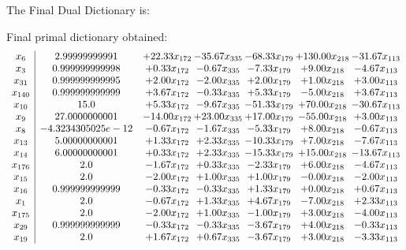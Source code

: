 \documentclass[8pt]{article}
\begin{document}
The Final Dual Dictionary is: 

 Final primal dictionary obtained: 
\[\begin{array}{c| c c@{\hskip 2pt} c@{\hskip 2pt} c@{\hskip 2pt} c@{\hskip 2pt} c@{\hskip 2pt} }
 x_{6}   &  2.99999999991 & + 22.33 x_{172} & -35.67 x_{335} & -68.33 x_{179} & + 130.00 x_{218} & -31.67 x_{113}\\
 x_{3}   &  0.999999999998 & +  0.33 x_{172} & -0.67 x_{335} & -7.33 x_{179} & +  9.00 x_{218} & -4.67 x_{113}\\
 x_{31}   &  0.999999999995 & +  2.00 x_{172} & -2.00 x_{335} & +  2.00 x_{179} & +  1.00 x_{218} & +  3.00 x_{113}\\
 x_{140}   &  0.999999999999 & +  3.67 x_{172} & -0.33 x_{335} & +  5.33 x_{179} & -5.00 x_{218} & +  3.67 x_{113}\\
 x_{10}   &  15.0 & +  5.33 x_{172} & -9.67 x_{335} & -51.33 x_{179} & + 70.00 x_{218} & -30.67 x_{113}\\
 x_{9}   &  27.0000000001 & -14.00 x_{172} & + 23.00 x_{335} & + 17.00 x_{179} & -55.00 x_{218} & +  3.00 x_{113}\\
 x_{8}   &  -4.3234305025e-12 & -0.67 x_{172} & -1.67 x_{335} & -5.33 x_{179} & +  8.00 x_{218} & -0.67 x_{113}\\
 x_{13}   &  5.00000000001 & +  1.33 x_{172} & +  2.33 x_{335} & -10.33 x_{179} & +  7.00 x_{218} & -7.67 x_{113}\\
 x_{14}   &  6.00000000001 & +  0.33 x_{172} & +  2.33 x_{335} & -15.33 x_{179} & + 15.00 x_{218} & -13.67 x_{113}\\
 x_{176}   &  2.0 & -1.67 x_{172} & +  0.33 x_{335} & -2.33 x_{179} & +  6.00 x_{218} & -4.67 x_{113}\\
 x_{15}   &  2.0 & -2.00 x_{172} & +  1.00 x_{335} & +  1.00 x_{179} & -0.00 x_{218} & -2.00 x_{113}\\
 x_{16}   &  0.999999999999 & -0.33 x_{172} & -0.33 x_{335} & +  1.33 x_{179} & +  0.00 x_{218} & +  0.67 x_{113}\\
 x_{1}   &  2.0 & -0.67 x_{172} & +  1.33 x_{335} & +  4.67 x_{179} & -7.00 x_{218} & +  2.33 x_{113}\\
 x_{175}   &  2.0 & -2.00 x_{172} & +  1.00 x_{335} & -1.00 x_{179} & +  3.00 x_{218} & -4.00 x_{113}\\
 x_{29}   &  0.999999999999 & -0.33 x_{172} & -0.33 x_{335} & -3.67 x_{179} & +  4.00 x_{218} & -0.33 x_{113}\\
 x_{19}   &  2.0 & +  1.67 x_{172} & +  0.67 x_{335} & -3.67 x_{179} & +  3.00 x_{218} & -3.33 x_{113}\\

\end{array}\]
\end{document}
